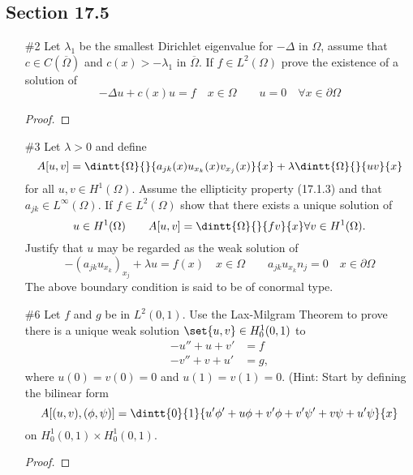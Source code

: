 \documentclass[11pt, oneside]{article}
\begin{document}
\subsection*{Section 17.5}
\begin{enumerate}
  \item[\#2]
    Let $\lambda_1$ be the smallest Dirichlet eigenvalue for $-\Delta$ in
    $\Omega$, assume that $c \in C(\overline{\Omega})$ and $c(x) > -\lambda_1$
    in $\overline{\Omega}$.
    If $f \in L^2(\Omega)$ prove the existence of a solution of
    \[
      -\Delta u + c(x) u = f \quad x \in \Omega \qquad u = 0 \quad \forall x \in \partial \Omega
    \]

    \begin{proof}
      
    \end{proof}

  \pagebreak
  \item[\#3]
    Let $\lambda > 0$ and define
    \[
      A[u, v] = \dintt{\Omega}{}{a_{jk}(x)u_{x_k}(x) v_{x_j}(x)}{x} + \lambda \dintt{\Omega}{}{uv}{x}
    \]
    for all $u, v \in H^1(\Omega)$.
    Assume the ellipticity property (17.1.3) and that $a_{jk} \in L^{\infty}(\Omega)$.
    If $f \in L^2(\Omega)$ show that there exists a unique solution of
    \[
      u \in H^1(\Omega) \qquad A[u, v] = \dintt{\Omega}{}{fv}{x} \forall v \in H^1(\Omega).
    \]
    Justify that $u$ may be regarded as the weak solution of
    \[
      -(a_{jk}u_{x_k})_{x_j} + \lambda u = f(x) \quad x \in \Omega \qquad a_{jk}u_{x_k}n_j = 0 \quad x \in \partial \Omega
    \]
    The above boundary condition is said to be of conormal type.

  \pagebreak
  \item[\#6]
    Let $f$ and $g$ be in $L^2(0, 1)$.
    Use the Lax-Milgram Theorem to prove there is a unique weak solution
    $\set{u, v} \in H^1_0(0, 1)$ to
    \begin{align*}
      -u'' + u + v' &= f \\
      -v'' + v + u' &= g,
    \end{align*}
    where $u(0) = v(0) = 0$ and $u(1) = v(1) = 0$.
    (Hint: Start by defining the bilinear form
    \[
      A[(u, v), (\phi, \psi)] = \dintt{0}{1}{u'\phi' + u\phi + v'\phi + v'\psi' + v\psi + u'\psi}{x}
    \]
    on $H^1_0(0, 1) \times H^1_0(0, 1)$.

    \begin{proof}
      
    \end{proof}

\end{enumerate}
\end{document}
